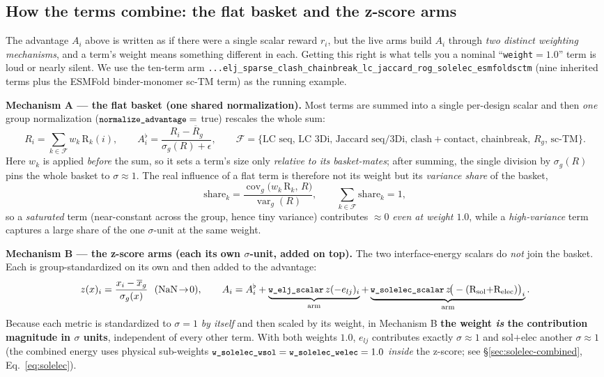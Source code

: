 \documentclass[11pt]{article}
\newcommand{\R}{\mathrm{R}}
\newcommand{\ttk}[1]{\texttt{\small #1}}
\begin{document}
\subsection{How the terms combine: the flat basket and the z-score arms}
\label{sec:reward-weighting}
The advantage $A_i$ above is written as if there were a single scalar reward $r_i$, but the live arms
build $A_i$ through \emph{two distinct weighting mechanisms}, and a term's weight means something
different in each. Getting this right is what tells you a nominal ``\ttk{weight}$=1.0$'' term is loud
or nearly silent. We use the ten-term arm
\ttk{...elj\_sparse\_clash\_chainbreak\_lc\_jaccard\_rog\_solelec\_esmfoldsctm} (nine inherited terms
plus the ESMFold binder-monomer sc-TM term) as the running example.

\textbf{Mechanism A --- the flat basket (one shared normalization).} Most terms are summed into a
single per-design scalar and then \emph{one} group normalization ($\ttk{normalize\_advantage}=$ true)
rescales the whole sum:
\[
R_i=\sum_{k\in\mathcal F} w_k\,\R_k(i),
\qquad
A^{\flat}_i=\frac{R_i-\overline{R}_g}{\sigma_g(R)+\epsilon},
\qquad \mathcal F=\{\text{LC seq, LC 3Di, Jaccard seq/3Di, clash}{+}\text{contact, chainbreak, }R_g\text{, sc-TM}\}.
\]
Here $w_k$ is applied \emph{before} the sum, so it sets a term's size only \emph{relative to its
basket-mates}; after summing, the single division by $\sigma_g(R)$ pins the whole basket to
$\sigma\!\approx\!1$. The real influence of a flat term is therefore not its weight but its
\emph{variance share} of the basket,
\[
\mathrm{share}_k=\frac{\operatorname{cov}_g\!\big(w_k\,\R_k,\,R\big)}{\operatorname{var}_g(R)},
\qquad \sum_{k\in\mathcal F}\mathrm{share}_k=1,
\]
so a \emph{saturated} term (near-constant across the group, hence tiny variance) contributes
$\approx\!0$ \emph{even at weight $1.0$}, while a \emph{high-variance} term captures a large share of
the one $\sigma$-unit at the same weight.

\textbf{Mechanism B --- the z-score arms (each its own $\sigma$-unit, added on top).} The two
interface-energy scalars do \emph{not} join the basket. Each is group-standardized on its own and
then added to the advantage:
\[
z(x)_i=\frac{x_i-\overline{x}_g}{\sigma_g(x)}\ \ (\text{NaN}\!\to\!0),
\qquad
A_i=A^{\flat}_i+\underbrace{\ttk{w\_elj\_scalar}\,z(-e_{lj})_i}_{\text{arm}}
        +\underbrace{\ttk{w\_solelec\_scalar}\,z\!\big(-(\R_{\mathrm{sol}}{+}\R_{\mathrm{elec}})\big)_i}_{\text{arm}}.
\]
Because each metric is standardized to $\sigma=1$ \emph{by itself} and then scaled by its weight, in
Mechanism B \textbf{the weight \emph{is} the contribution magnitude in $\sigma$ units}, independent of
every other term. With both weights $1.0$, $e_{lj}$ contributes exactly $\sigma\!\approx\!1$ and
sol$+$elec another $\sigma\!\approx\!1$ (the combined energy uses physical sub-weights
$\ttk{w\_solelec\_wsol}=\ttk{w\_solelec\_welec}=1.0$ \emph{inside} the z-score; see
\S\ref{sec:solelec-combined}, Eq.~\ref{eq:solelec}).
\end{document}

